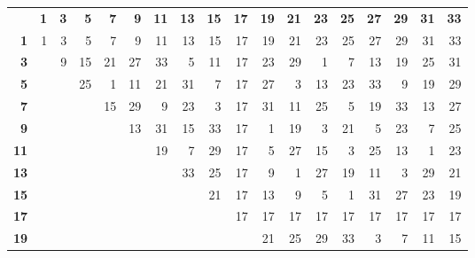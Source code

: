 \begin{tabular}{rllllllllrrrrrrrrr}

\multicolumn{1}{l}{\textbf{}} & \multicolumn{1}{r}{\textbf{1}} & \multicolumn{1}{r}{\textbf{3}} & \multicolumn{1}{r}{\textbf{5}} & \multicolumn{1}{r}{\textbf{7}} & \multicolumn{1}{r}{\textbf{9}} & \multicolumn{1}{r}{\textbf{11}} & \multicolumn{1}{r}{\textbf{13}} & \multicolumn{1}{r}{\textbf{15}} & \textbf{17} & \textbf{19} & \textbf{21} & \textbf{23} & \textbf{25} & \textbf{27} & \textbf{29} & \textbf{31} & \textbf{33} \\ 
\textbf{1} & \multicolumn{1}{r}{1} & \multicolumn{1}{r}{3} & \multicolumn{1}{r}{5} & \multicolumn{1}{r}{7} & \multicolumn{1}{r}{9} & \multicolumn{1}{r}{11} & \multicolumn{1}{r}{13} & \multicolumn{1}{r}{15} & 17 & 19 & 21 & 23 & 25 & 27 & 29 & 31 & 33 \\ 
\textbf{3} &  & \multicolumn{1}{r}{9} & \multicolumn{1}{r}{15} & \multicolumn{1}{r}{21} & \multicolumn{1}{r}{27} & \multicolumn{1}{r}{33} & \multicolumn{1}{r}{5} & \multicolumn{1}{r}{11} & 17 & 23 & 29 & 1 & 7 & 13 & 19 & 25 & 31 \\ 
\textbf{5} &  &  & \multicolumn{1}{r}{25} & \multicolumn{1}{r}{1} & \multicolumn{1}{r}{11} & \multicolumn{1}{r}{21} & \multicolumn{1}{r}{31} & \multicolumn{1}{r}{7} & 17 & 27 & 3 & 13 & 23 & 33 & 9 & 19 & 29 \\ 
\textbf{7} &  &  &  & \multicolumn{1}{r}{15} & \multicolumn{1}{r}{29} & \multicolumn{1}{r}{9} & \multicolumn{1}{r}{23} & \multicolumn{1}{r}{3} & 17 & 31 & 11 & 25 & 5 & 19 & 33 & 13 & 27 \\ 
\textbf{9} &  &  &  &  & \multicolumn{1}{r}{13} & \multicolumn{1}{r}{31} & \multicolumn{1}{r}{15} & \multicolumn{1}{r}{33} & 17 & 1 & 19 & 3 & 21 & 5 & 23 & 7 & 25 \\ 
\textbf{11} &  &  &  &  &  & \multicolumn{1}{r}{19} & \multicolumn{1}{r}{7} & \multicolumn{1}{r}{29} & 17 & 5 & 27 & 15 & 3 & 25 & 13 & 1 & 23 \\ 
\textbf{13} &  &  &  &  &  &  & \multicolumn{1}{r}{33} & \multicolumn{1}{r}{25} & 17 & 9 & 1 & 27 & 19 & 11 & 3 & 29 & 21 \\ 
\textbf{15} &  &  &  &  &  &  &  & \multicolumn{1}{r}{21} & 17 & 13 & 9 & 5 & 1 & 31 & 27 & 23 & 19 \\ 
\textbf{17} &  &  &  &  &  &  &  &  & 17 & 17 & 17 & 17 & 17 & 17 & 17 & 17 & 17 \\ 
\textbf{19} &  &  &  &  &  &  &  &  & \multicolumn{1}{l}{} & 21 & 25 & 29 & 33 & 3 & 7 & 11 & 15 \\ 

\end{tabular}
